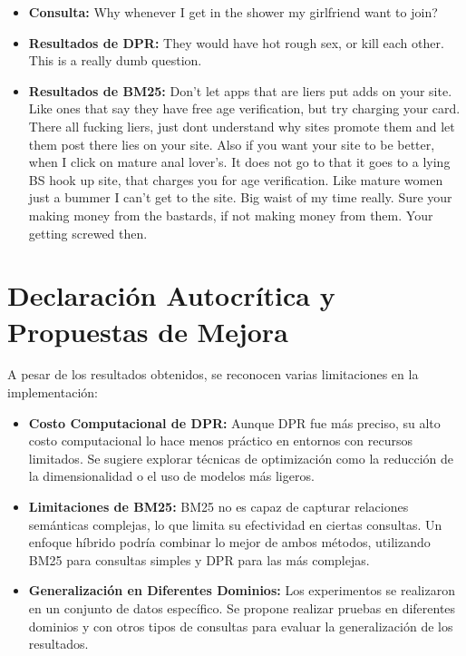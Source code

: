 \documentclass[runningheads]{llncs}
\begin{document}
\begin{itemize}
    \item \textbf{Consulta:} Why whenever I get in the shower my girlfriend want to join?
    \vspace{0.3cm}
    \item \textbf{Resultados de DPR:} They would have hot rough sex, or kill each other. This is a really dumb question.
    \vspace{0.3cm}
    \item \textbf{Resultados de BM25:} Don't let apps that are liers put adds on your site. Like ones that say they have free age verification, but try charging your card. There all fucking liers, just dont understand why sites promote them and let them post there lies on your site. Also if you want your site to be better, when I click on mature anal lover's. It does not go to that it goes to a lying BS hook up site, that charges you for age verification. Like mature women just a bummer I can't get to the site. Big waist of my time really. Sure your making money from the bastards, if not making money from them. Your getting screwed then.
\end{itemize}

\section{Declaración Autocrítica y Propuestas de Mejora}
A pesar de los resultados obtenidos, se reconocen varias limitaciones en la implementación:
\begin{itemize}
    \item \textbf{Costo Computacional de DPR:} Aunque DPR fue más preciso, su alto costo computacional lo hace menos práctico en entornos con recursos limitados. Se sugiere explorar técnicas de optimización como la reducción de la dimensionalidad o el uso de modelos más ligeros.
    \item \textbf{Limitaciones de BM25:} 
    BM25 no es capaz de capturar relaciones semánticas complejas, lo que limita su efectividad en ciertas consultas. Un enfoque híbrido podría combinar lo mejor de ambos métodos, utilizando BM25 para consultas simples y DPR para las más complejas.
    \item \textbf{Generalización en Diferentes Dominios:} Los experimentos se realizaron en un conjunto de datos específico. Se propone realizar pruebas en diferentes dominios y con otros tipos de consultas para evaluar la generalización de los resultados.
\end{itemize}
\end{document}
